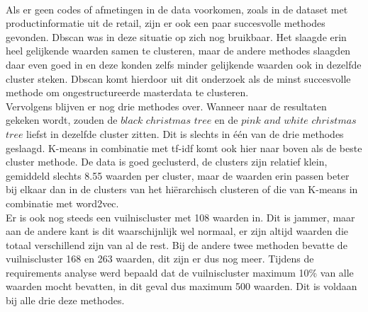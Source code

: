 \\\indent
Als er geen codes of afmetingen in de data voorkomen, zoals in de dataset met productinformatie uit de retail, zijn er ook een paar succesvolle methodes gevonden. Dbscan was in deze situatie op zich nog bruikbaar. Het slaagde erin heel gelijkende waarden samen te clusteren, maar de andere methodes slaagden daar even goed in en deze konden zelfs minder gelijkende waarden ook in dezelfde cluster steken. Dbscan komt hierdoor uit dit onderzoek als de minst succesvolle methode om ongestructureerde masterdata te clusteren.
\\\indent
Vervolgens blijven er nog drie methodes over. Wanneer naar de resultaten gekeken wordt, zouden de $black$ $christmas$ $tree$ en de $pink$ $and$ $white$ $christmas$ $tree$ liefst in dezelfde cluster zitten. Dit is slechts in één van de drie methodes geslaagd. K-means in combinatie met tf-idf komt ook hier naar boven als de beste cluster methode. De data is goed geclusterd, de clusters zijn relatief klein, gemiddeld slechts 8.55 waarden per cluster, maar de waarden erin passen beter bij elkaar dan in de clusters van het hiërarchisch clusteren of die van K-means in combinatie met word2vec.
\\\indent
Er is ook nog steeds een vuilniscluster met 108 waarden in. Dit is jammer, maar aan de andere kant is dit waarschijnlijk wel normaal, er zijn altijd waarden die totaal verschillend zijn van al de rest. Bij de andere twee methoden bevatte de vuilniscluster 168 en 263 waarden, dit zijn er dus nog meer. Tijdens de requirements analyse werd bepaald dat de vuilniscluster maximum 10\% van alle waarden mocht bevatten, in dit geval dus maximum 500 waarden. Dit is voldaan bij alle drie deze methodes.
\\\indent

